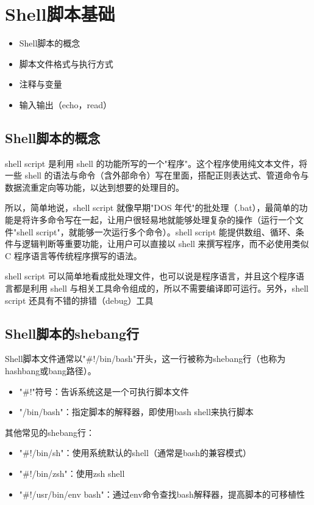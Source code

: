 \documentclass[12pt,UTF8]{ctexbook}
\begin{document}
\section{Shell脚本基础}
\begin{itemize}
    \item Shell脚本的概念
    \item 脚本文件格式与执行方式
    \item 注释与变量
    \item 输入输出（echo，read）
\end{itemize}

\subsection{Shell脚本的概念}
shell script 是利用 shell 的功能所写的一个"程序"。这个程序使用纯文本文件，将一些 shell 的语法与命令（含外部命令）写在里面，搭配正则表达式、管道命令与数据流重定向等功能，以达到想要的处理目的。

所以，简单地说，shell script 就像早期"DOS 年代"的批处理（.bat），最简单的功能是将许多命令写在一起，让用户很轻易地就能够处理复杂的操作（运行一个文件"shell script"，就能够一次运行多个命令）。shell script 能提供数组、循环、条件与逻辑判断等重要功能，让用户可以直接以 shell 来撰写程序，而不必使用类似 C 程序语言等传统程序撰写的语法。

shell script 可以简单地看成批处理文件，也可以说是程序语言，并且这个程序语言都是利用 shell 与相关工具命令组成的，所以不需要编译即可运行。另外，shell script 还具有不错的排错（debug）工具

\subsection{Shell脚本的shebang行}
Shell脚本文件通常以"#!/bin/bash"开头，这一行被称为shebang行（也称为hashbang或bang路径）。

\begin{itemize}
    \item "#!"符号：告诉系统这是一个可执行脚本文件
    \item "/bin/bash"：指定脚本的解释器，即使用bash shell来执行脚本
\end{itemize}

其他常见的shebang行：
\begin{itemize}
    \item "#!/bin/sh"：使用系统默认的shell（通常是bash的兼容模式）
    \item "#!/bin/zsh"：使用zsh shell
    \item "#!/usr/bin/env bash"：通过env命令查找bash解释器，提高脚本的可移植性
\end{itemize}
\end{document}

